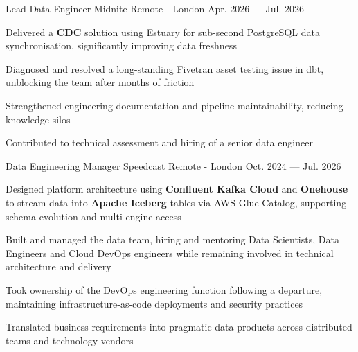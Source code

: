 
\begin{cventries}

  \cventry
  {Lead Data Engineer} %
  {Midnite } %
  {Remote - London} %
  {Apr. 2026 --- Jul. 2026} %
  {
    \begin{cvitems} %
    \item {Delivered a \textbf{CDC} solution using Estuary for sub-second PostgreSQL data synchronisation, significantly improving data freshness}
    \item {Diagnosed and resolved a long-standing Fivetran asset testing issue in dbt, unblocking the team after months of friction}
    \item {Strengthened engineering documentation and pipeline maintainability, reducing knowledge silos}
    \item {Contributed to technical assessment and hiring of a senior data engineer}
    \end{cvitems}
  }

  \cventry
  {Data Engineering Manager} %
  {Speedcast } %
  {Remote - London} %
  {Oct. 2024 --- Jul. 2026} %
  {
    \begin{cvitems} %
    \item {Designed platform architecture using \textbf{Confluent Kafka Cloud} and \textbf{Onehouse} to stream data into \textbf{Apache Iceberg} tables via AWS Glue Catalog, supporting schema evolution and multi-engine access}
    \item {Built and managed the data team, hiring and mentoring Data Scientists, Data Engineers and Cloud DevOps engineers while remaining involved in technical architecture and delivery}
    \item {Took ownership of the DevOps engineering function following a departure, maintaining infrastructure-as-code deployments and security practices}
    \item {Translated business requirements into pragmatic data products across distributed teams and technology vendors}
    \end{cvitems}
  }


\end{cventries}

